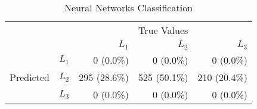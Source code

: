 \begin{table}
\centering
  \caption{Neural Networks Classification}
    \begin{tabular}{rrrrr}
    \toprule
    & &\multicolumn{3}{c}{True Values}\\
    & & ${L_1}$ & ${L_2}$ & ${L_3}$ \\
    \multirow{3}{*}{Predicted} & ${L_1}$ & 0 (0.0\%) & 0 (0.0\%) & 0 (0.0\%) \\
    & ${L_2}$ & 295 (28.6\%) & 525 (50.1\%) & 210 (20.4\%) \\
    & ${L_3}$ & 0 (0.0\%) & 0 (0.0\%) & 0 (0.0\%) \\\bottomrule
  \end{tabular}
\end{table}

